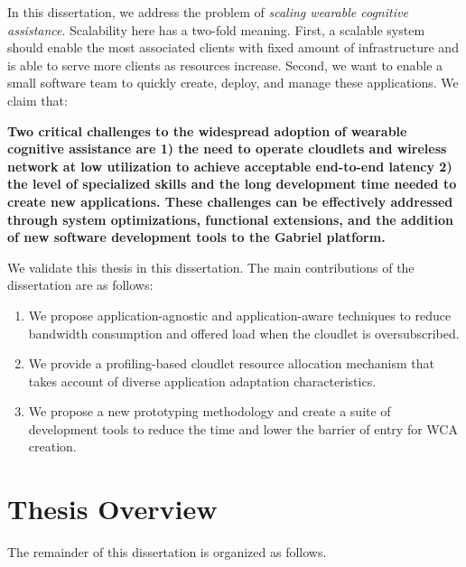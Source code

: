In this dissertation, we address the problem of \textit{scaling wearable cognitive assistance}.
Scalability here has a two-fold meaning. First, a scalable system should enable
the most associated clients with fixed amount of infrastructure and is able to
serve more clients as resources increase. Second, we want to enable a small
software team to quickly create, deploy, and manage these applications. 
We claim that:

\textbf{Two critical challenges to the widespread adoption of wearable cognitive
  assistance are 1) the need to operate cloudlets and wireless network at low
  utilization to achieve acceptable end-to-end latency 2) the level of specialized
  skills and the long development time needed to create new applications. These
  challenges can be effectively addressed through system optimizations,
  functional extensions, and the addition of new software development tools to
  the Gabriel platform.}


We validate this thesis in this dissertation. The main contributions of the
dissertation are as follows:
\begin{enumerate}
  \item{We propose application-agnostic and application-aware techniques to
  reduce bandwidth consumption and offered load when the cloudlet is
  oversubscribed.}
  \item{We provide a profiling-based cloudlet resource allocation mechanism that
  takes account of diverse application adaptation characteristics.}
  \item{We propose a new prototyping methodology and create a suite of
  development tools to reduce the time and lower the barrier of entry for WCA
  creation.}
\end{enumerate}

\section{Thesis Overview}

The remainder of this dissertation is organized as follows.

